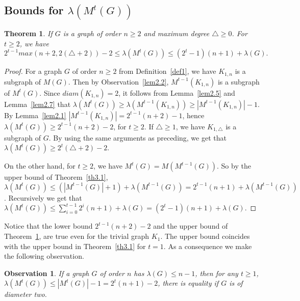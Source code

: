 \documentclass{article}
\newtheorem{theorem} {Theorem}
\newtheorem{obs}{Observation}
\newtheorem{open problem} {Open Problem}
\numberwithin{lemma}{section}
\numberwithin{theorem}{section}
\numberwithin{cor}{section}
\numberwithin{prop}{section}
\numberwithin{con}{section}
\numberwithin{claim}{section}
\numberwithin{obs}{section}
\numberwithin{dnt}{section}
\begin{document}
\subsection{Bounds for $\lambda(M^t(G))$}
\begin{theorem}\label{th4.1}
	If $G$ is a  graph of order $n\geq 2$ and maximum degree $\bigtriangleup\geq 0$. For $t\geq 2$, we have $$2^{t-1}max(n+2, 2(\bigtriangleup+2))-2 \leq \lambda(M^t (G))\leq  (2^t-1)(n+1)+\lambda(G).$$
\end{theorem}
\begin{proof}
	For a graph $G$ of order $n\geq 2$ from Definition~\ref{def1}, we have $K_{1,n}$ is a subgraph of $M(G)$. Then by Observation~\ref{lem2.2}, $M^{t-1}(K_{1,n})$ is a subgraph of $M^t(G)$. Since $diam(K_{1,n})=2$, it follows from Lemma~\ref{lem2.5} and Lemma~\ref{lem2.7} that $ \lambda(M^t (G)) \geq \lambda(M^{t-1}(K_{1,n}))\geq |M^{t-1}(K_{1,n})|-1$.  By Lemma~\ref{lem2.1} $|M^{t-1}(K_{1,n})|=2^{t-1}(n+2)-1$, hence $ \lambda(M^t (G)) \geq 2^{t-1}(n+2)-2$, for $t\geq 2$. If $\bigtriangleup \geq 1$,  we have  $K_{1,\bigtriangleup}$ is a subgraph of $G$. By using the same arguments as preceding, we get that  $ \lambda(M^t (G))\geq 2^t(\bigtriangleup+2)-2$.
	\par On the other hand, for $t\geq2$, we have $M^t(G)=M(M^{t-1}(G))$. So by the upper bound of Theorem~\ref{th3.1},  $\lambda(M^t(G) )\leq (|M^{t-1}(G)|+1)+\lambda(M^{t-1}(G))=2^{t-1}(n+1)+\lambda(M^{t-1}(G))$. Recursively we get that $\lambda(M^t(G) )\leq \sum_{i=0}^{t-1}2^i(n+1)+\lambda(G)=(2^t-1)(n+1)+\lambda(G). $
\end{proof}
Notice that the lower bound $2^{t-1}(n+2)-2$ and the upper bound of Theorem~\ref{th4.1}, are true even for the trivial graph $K_1$. The upper bound coincides with the upper bound in Theorem~\ref{th3.1} for $t=1$. As a consequence we make the following observation.
\begin{obs}\label{obs4.1}
	If a graph $G$ of order $n$  has $\lambda(G)\leq n-1$, then for any $t\geq 1$, $\lambda(M^t(G))\leq |M^t(G) |-1=2^t(n+1)-2$,  there is equality if $G$ is of diameter two.
\end{obs}
\end{document}
